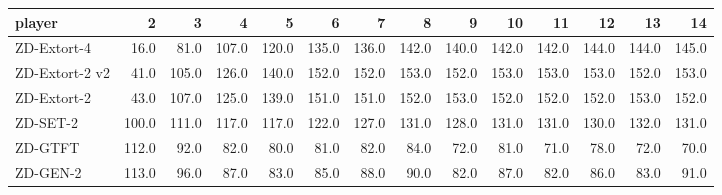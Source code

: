 \begin{tabular}{lrrrrrrrrrrrrr}
\toprule
         player &      2 &      3 &      4 &      5 &      6 &      7 &      8 &      9 &     10 &     11 &     12 &     13 &     14 \\
\midrule
    ZD-Extort-4 &   16.0 &   81.0 &  107.0 &  120.0 &  135.0 &  136.0 &  142.0 &  140.0 &  142.0 &  142.0 &  144.0 &  144.0 &  145.0 \\
 ZD-Extort-2 v2 &   41.0 &  105.0 &  126.0 &  140.0 &  152.0 &  152.0 &  153.0 &  152.0 &  153.0 &  153.0 &  153.0 &  152.0 &  153.0 \\
    ZD-Extort-2 &   43.0 &  107.0 &  125.0 &  139.0 &  151.0 &  151.0 &  152.0 &  153.0 &  152.0 &  152.0 &  152.0 &  153.0 &  152.0 \\
       ZD-SET-2 &  100.0 &  111.0 &  117.0 &  117.0 &  122.0 &  127.0 &  131.0 &  128.0 &  131.0 &  131.0 &  130.0 &  132.0 &  131.0 \\
        ZD-GTFT &  112.0 &   92.0 &   82.0 &   80.0 &   81.0 &   82.0 &   84.0 &   72.0 &   81.0 &   71.0 &   78.0 &   72.0 &   70.0 \\
       ZD-GEN-2 &  113.0 &   96.0 &   87.0 &   83.0 &   85.0 &   88.0 &   90.0 &   82.0 &   87.0 &   82.0 &   86.0 &   83.0 &   91.0 \\
\bottomrule
\end{tabular}
